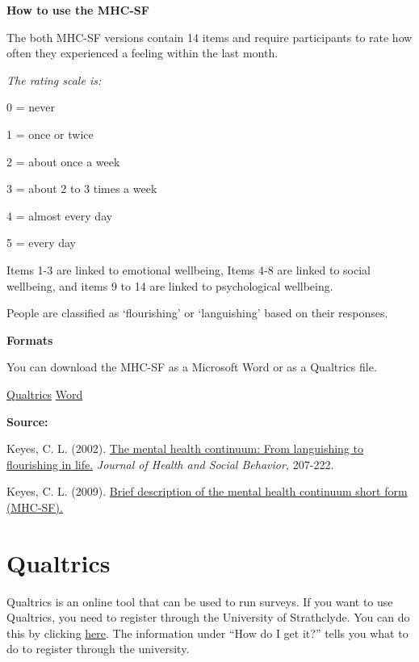 \documentclass[
]{book}
\begin{document}
\textbf{How to use the MHC-SF}

The both MHC-SF versions contain 14 items and require participants to rate how often they experienced a feeling within the last month.

\emph{The rating scale is:}

0 = never

1 = once or twice

2 = about once a week

3 = about 2 to 3 times a week

4 = almost every day

5 = every day

Items 1-3 are linked to emotional wellbeing, Items 4-8 are linked to social wellbeing, and items 9 to 14 are linked to psychological wellbeing.

People are classified as `flourishing' or `languishing' based on their responses.

\textbf{Formats}

You can download the MHC-SF as a Microsoft Word or as a Qualtrics file.

\href{questionnaires/MentalHealthContinuum_Adults.qsf}{Qualtrics} \textbar{}
\href{questionnaires/MentalHealthContinuum_Adults.docx}{Word}

\textbf{Source:}

Keyes, C. L. (2002). \href{https://www.researchgate.net/profile/Corey_Keyes/publication/11278728_The_Mental_Health_Continuum_From_Languishing_to_Flourishing_in_Life/links/0046352b1a6f89da77000000/The-Mental-Health-Continuum-From-Languishing-to-Flourishing-in-Life.pdf}{The mental health continuum: From languishing to flourishing in life.} \emph{Journal of Health and Social Behavior,} 207-222.

Keyes, C. L. (2009). \href{https://www.aacu.org/sites/default/files/MHC-SFEnglish.pdf}{Brief description of the mental health continuum short form (MHC-SF).}

\hypertarget{qualtrics}{%
\chapter{Qualtrics}\label{qualtrics}}

Qualtrics is an online tool that can be used to run surveys. If you want to use Qualtrics, you need to register through the University of Strathclyde. You can do this by clicking \href{https://www.strath.ac.uk/is/software/qualtrics/}{here}. The information under ``How do I get it?'' tells you what to do to register through the university.
\end{document}
